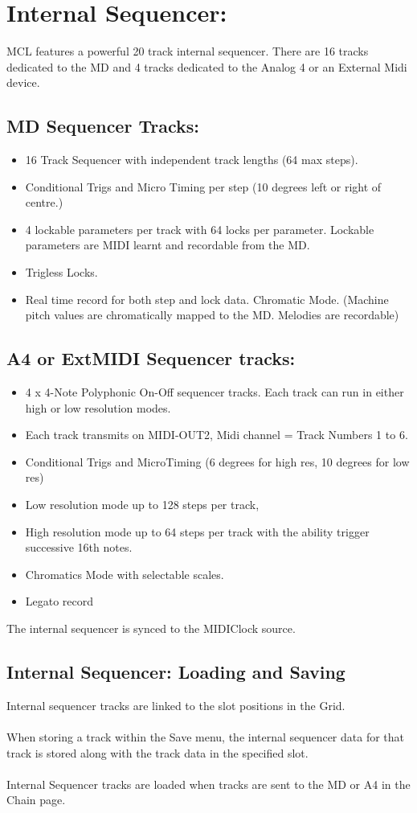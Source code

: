 \chapter{Internal Sequencer:}
MCL features a powerful 20 track internal sequencer. There are 16 tracks dedicated to the MD and 4 tracks dedicated to the Analog 4 or an External Midi device.
\section{MD Sequencer Tracks:}
\begin{itemize}
\item 16 Track Sequencer with independent track lengths (64 max steps).
\item Conditional Trigs and Micro Timing per step (10 degrees left or right of centre.)
\item 4 lockable parameters per track with 64 locks per parameter. Lockable parameters are MIDI learnt and recordable from the MD.
\item Trigless Locks.
\item Real time record for both step and lock data.
Chromatic Mode. (Machine pitch values are chromatically mapped to the MD. Melodies are recordable)
\end{itemize}
\section{A4 or ExtMIDI Sequencer tracks:}
\begin{itemize}
\item 4 x 4-Note Polyphonic On-Off sequencer tracks. Each track can run in either high or low resolution modes. 
\item Each track transmits on MIDI-OUT2, Midi channel = Track Numbers 1 to 6.
\item Conditional Trigs and MicroTiming (6 degrees for high res, 10 degrees for low res)
\item Low resolution mode up to 128 steps per track,
\item High resolution mode up to 64 steps per track with the ability trigger successive 16th notes.
\item Chromatics Mode with selectable scales.
\item Legato record
\end{itemize}
The internal sequencer is synced to the MIDIClock source.
\\
\section{Internal Sequencer: Loading and Saving}
Internal sequencer tracks are linked to the slot positions in the Grid.\\
\\
When storing a track within the Save menu, the internal sequencer data for that track is stored along with the track data in the specified slot.\\
\\
Internal Sequencer tracks are loaded when tracks are sent to the MD or A4 in the Chain page.

